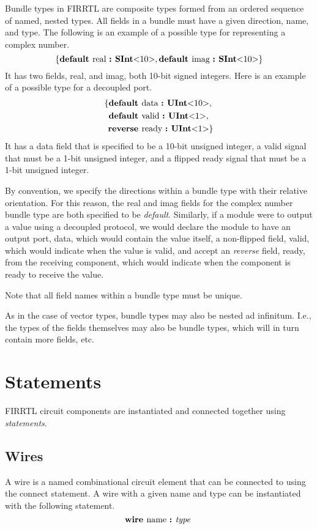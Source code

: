 \documentclass[10pt]{article}
\begin{document}
Bundle types in FIRRTL are composite types formed from an ordered sequence of named, nested types.
All fields in a bundle must have a given direction, name, and type.
The following is an example of a possible type for representing a complex number.
\[
\{\text{\bf default\ } \text{real } \text{\bf :\ } \text{\bf SInt}\text{\bf $<$} 10 \text{\bf $>$},
         \text{\bf default\ } \text{imag } \text{\bf :\ } \text{\bf SInt}\text{\bf $<$} 10 \text{\bf $>$}\}
\]
It has two fields, real, and imag, both 10-bit signed integers.
Here is an example of a possible type for a decoupled port. 
\[
\begin{aligned}
\{ \text{\bf default\ } &\text{data } \text{\bf :\ } \text{\bf UInt}\text{\bf $<$} 10 \text{\bf $>$}, \\
   \text{\bf default\ } &\text{valid } \text{\bf :\ } \text{\bf UInt}\text{\bf $<$} 1 \text{\bf $>$}, \\
   \text{\bf reverse\ } &\text{ready } \text{\bf :\ } \text{\bf UInt}\text{\bf $<$} 1 \text{\bf $>$}\} \\
\end{aligned}
\]
It has a data field that is specified to be a 10-bit unsigned integer, a valid signal that must be a 1-bit unsigned integer, and a flipped ready signal that must be a 1-bit unsigned integer.

By convention, we specify the directions within a bundle type with their relative orientation.
For this reason, the real and imag fields for the complex number bundle type are both specified to be {\em default}.
Similarly, if a module were to output a value using a decoupled protocol, we would declare the module to have an output port, data, which would contain the value itself, a non-flipped field, valid, which would indicate when the value is valid, and accept an {\em reverse} field, ready, from the receiving component, which would indicate when the component is ready to receive the value.

Note that all field names within a bundle type must be unique.

As in the case of vector types, bundle types may also be nested ad infinitum.
I.e., the types of the fields themselves may also be bundle types, which will in turn contain more fields, etc. 

\section{Statements} \label{statements}

FIRRTL circuit components are instantiated and connected together using {\em statements}.

\subsection{Wires}
A wire is a named combinational circuit element that can be connected to using the connect statement.
A wire with a given name and type can be instantiated with the following statement.
\[
\text{\bf wire\ } \text{name } \text{\bf :\ } \text{\em type\ } \\
\]
\end{document}
